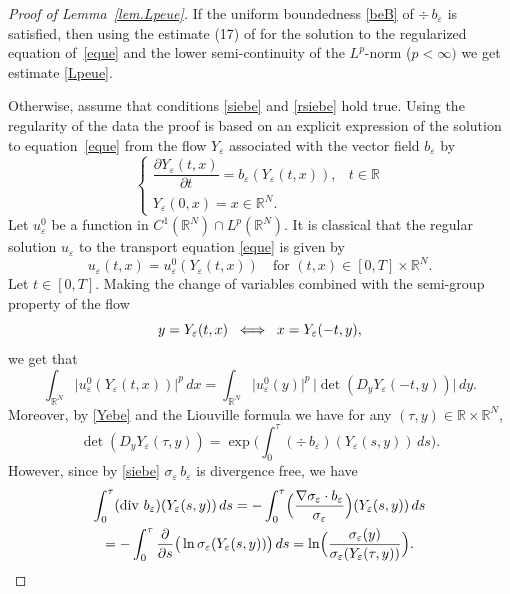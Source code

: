 \documentclass[11pt]{article}
\newcommand\ssi{\mathchoice{\iff}{\Leftrightarrow}{\Leftrightarrow}{\Leftrightarrow}}
\def \RR {\mathbb R}
\theoremstyle{plain}
\theoremstyle{definition}
\numberwithin{equation}{section}
\begin{document}
\begin{proof}[Proof of Lemma~\ref{lem.Lpeue}]
If the uniform boundedness \eqref{beB} of $\div\,b_\varepsilon$ is satisfied, then using the estimate (17) of \cite[Prop.\,II.1]{DiLi} for the solution to the regularized equation of~\eqref{eque} and the lower semi-continuity of the $L^p$-norm ($p<\infty)$ we get estimate \eqref{Lpeue}.

Otherwise, assume that conditions \eqref{siebe} and \eqref{rsiebe} hold true.
Using the regularity of the data the proof is based on an explicit expression of the solution to equation~\eqref{eque} from the flow $Y_\varepsilon$ associated with the vector field $b_\varepsilon$ by
\begin{equation}\label{Yebe}
\begin{cases}
\dfrac{\partial Y_\varepsilon(t,x)}{\partial t}=b_\varepsilon(Y_\varepsilon(t,x)), & t\in\RR
\\[5pt]
Y_\varepsilon(0,x)=x\in\RR^N.
\end{cases}
\end{equation}
Let $u_\varepsilon^0$ be a function in $C^1(\RR^N)\cap L^p(\RR^N)$.
It is classical that the regular solution $u_\varepsilon$ to the transport equation \eqref{eque} is given by
\begin{equation}\label{ueXe}
u_\varepsilon(t,x)=u_\varepsilon^0(Y_\varepsilon(t,x))\quad\mbox{for }(t,x)\in[0,T]\times\RR^N.
\end{equation}
Let $t\in[0,T]$. Making the change of variables combined with the semi-group property of the flow
\[
y=Y_\varepsilon(t,x)\;\ssi\;x=Y_\varepsilon(-t,y),
\]
we get that
\begin{equation}\label{Lpeue01}
\int_{\RR^N}\big|u_\varepsilon^0(Y_\varepsilon(t,x))\big|^p\,dx=\int_{\RR^N}\big|u_\varepsilon^0(y)\big|^p\,\big|\det(D_y Y_\varepsilon(-t,y))\big|\,dy.
\end{equation}
Moreover, by \eqref{Yebe} and the Liouville formula we have for any $(\tau,y)\in\RR\times\RR^N$,
\[
\det(D_y Y_\varepsilon(\tau,y))=\exp\biggl(\int_0^{\tau}(\div\,b_\varepsilon)(Y_\varepsilon(s,y))\,ds\biggr).
\]
However, since by \eqref{siebe} $\sigma_\varepsilon\,b_\varepsilon$ is divergence free, we have
\begin{multline*}
 \int_0^{\tau}(\div\,b_\varepsilon)(Y_\varepsilon(s,y))\,ds=-\int_0^{\tau}\Bigl(\dfrac{\nabla\sigma_\varepsilon\cdot b_\varepsilon}{\sigma_\varepsilon}\Bigr)(Y_\varepsilon(s,y))\,ds
\\
=-\int_0^{\tau} \dfrac{\partial}{\partial s}\big(\ln \sigma_\varepsilon(Y_\varepsilon(s,y))\big)\,ds=\ln\Bigl(\dfrac{\sigma_\varepsilon(y)}{\sigma_\varepsilon(Y_\varepsilon(\tau,y))}\Bigr).

\end{multline*}
\end{proof}
\end{document}
